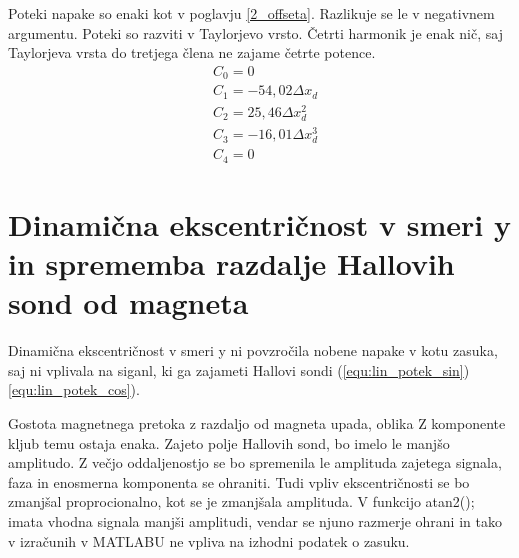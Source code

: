 Poteki napake so enaki kot v poglavju \ref{2_offseta}. Razlikuje se le v negativnem argumentu. Poteki so razviti v Taylorjevo vrsto. Četrti harmonik je enak nič, saj Taylorjeva vrsta do tretjega člena ne zajame četrte potence.
\begin{eqnarray}
&C_0 =0\\
&C_1 =-54,02\Delta x_d\\     
&C_2 =25,46\Delta x_d^{2}\\             
&C_3 =-16,01\Delta x_d^{3}\\         
&C_4 =0            
\end{eqnarray}
\section{Dinamična ekscentričnost v smeri y in sprememba razdalje Hallovih sond od magneta }
Dinamična ekscentričnost v smeri y ni povzročila nobene napake v kotu zasuka, saj ni vplivala na siganl, ki ga zajameti Hallovi sondi (\ref{equ:lin_potek_sin})\ref{equ:lin_potek_cos}).

Gostota magnetnega pretoka z razdaljo od magneta upada, oblika Z komponente kljub temu ostaja enaka. Zajeto polje Hallovih sond, bo imelo le manjšo amplitudo. Z večjo oddaljenostjo se bo spremenila le amplituda zajetega signala, faza in enosmerna komponenta se ohraniti. Tudi vpliv ekscentričnosti se bo zmanjšal proprocionalno, kot se je zmanjšala amplituda. V funkcijo atan2(); imata vhodna signala manjši amplitudi, vendar se njuno razmerje ohrani in tako v izračunih v MATLABU ne vpliva na izhodni podatek o zasuku.